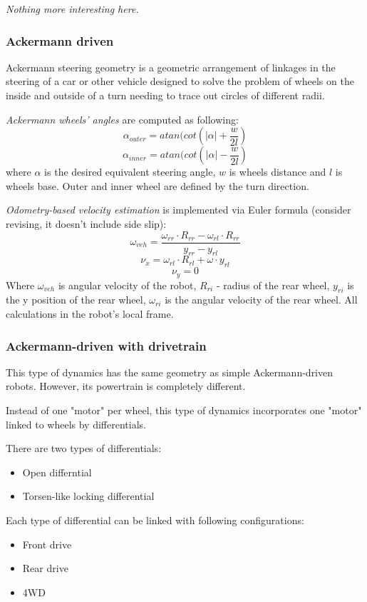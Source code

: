 \documentclass[a4paper,11pt]{article}
\begin{document}
\textit{Nothing more interesting here.}
\subsubsection{Ackermann driven}

Ackermann steering geometry is a geometric arrangement of linkages in the steering of a car or other vehicle designed to solve the problem of wheels on the inside and outside of a turn needing to trace out circles of different radii.

\textit{Ackermann wheels' angles }are computed as following:
\[
\alpha_{outer} = atan(cot(|\alpha| + \frac{w}{2l})
\]
\[
\alpha_{inner} = atan(cot(|\alpha| - \frac{w}{2l})
\]
where $\alpha$ is the desired equivalent steering angle, $w$ is wheels distance and $l$ is wheels base.
Outer and inner wheel are defined by the turn direction.



\textit{Odometry-based velocity estimation} is implemented via Euler formula (consider revising, it doesn't include side slip):
\[
\omega_{veh} = \frac{\omega_{rr} \cdot R_{rr} - \omega_{rl} \cdot R_{rr}}{y_{rr} - y_{rl}}
\]
\[
\nu_x = \omega_{rl} \cdot R_{rl} + \omega \cdot y_{rl}
\]
\[
\nu_y = 0
\]
Where $\omega_{veh}$ is angular velocity of the robot, $R_{ri}$ - radius of the rear wheel, $y_{ri}$ is the y position of the rear wheel, $\omega_{ri}$ is the angular velocity of the rear wheel. All calculations in the robot's local frame. 


\subsubsection{Ackermann-driven with drivetrain}

This type of dynamics has the same geometry as simple Ackermann-driven robots. However, its powertrain is completely different. 

Instead of one "motor" per wheel, this type of dynamics incorporates one "motor" linked to wheels by differentials. 

There are two types of differentials:
\begin{itemize}
	\item Open differntial
	\item Torsen-like locking differential
\end{itemize}

Each type of differential can be linked with following configurations: 
\begin{itemize}
	\item Front drive
	\item Rear drive
	\item 4WD
\end{itemize}
\end{document}
